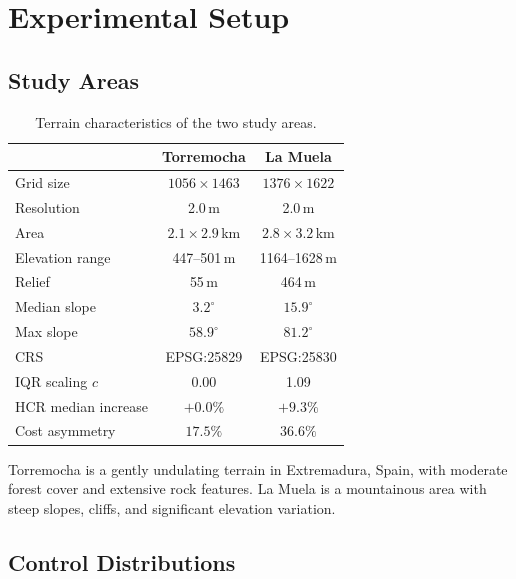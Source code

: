 \documentclass[11pt,a4paper]{article}
\begin{document}
\section{Experimental Setup}
\label{sec:experiments}

\subsection{Study Areas}

\begin{table}[H]
\centering
\caption{Terrain characteristics of the two study areas.}
\label{tab:terrain}
\begin{tabular}{lcc}
\toprule
& \textbf{Torremocha} & \textbf{La Muela} \\
\midrule
Grid size & $1056 \times 1463$ & $1376 \times 1622$ \\
Resolution & 2.0\,m & 2.0\,m \\
Area & $2.1 \times 2.9$\,km & $2.8 \times 3.2$\,km \\
Elevation range & 447--501\,m & 1164--1628\,m \\
Relief & 55\,m & 464\,m \\
Median slope & $3.2^\circ$ & $15.9^\circ$ \\
Max slope & $58.9^\circ$ & $81.2^\circ$ \\
CRS & EPSG:25829 & EPSG:25830 \\
IQR scaling $c$ & 0.00 & 1.09 \\
HCR median increase & $+0.0\%$ & $+9.3\%$ \\
Cost asymmetry & $17.5\%$ & $36.6\%$ \\
\bottomrule
\end{tabular}
\end{table}

Torremocha is a gently undulating terrain in Extremadura, Spain, with moderate forest cover and extensive rock features.
La Muela is a mountainous area with steep slopes, cliffs, and significant elevation variation.

\subsection{Control Distributions}
\end{document}
